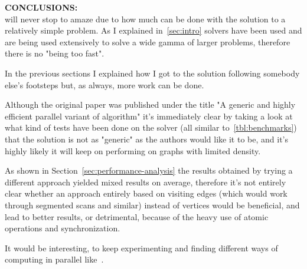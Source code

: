 \documentclass[a4paper,10pt]{article}
\begin{document}
\bigskip
{}
\makeatletter{}\makeatother\label{sec:final-thoughts}
\noindent
\textbf{CONCLUSIONS:}
\\
\mstp will never stop to amaze due to how much can be done with the solution to a relatively simple problem. As I explained in~\ref{sec:intro} \mstp solvers have been used and are being used extensively to solve a wide gamma of larger problems, therefore there is no "being too fast".

In the previous sections I explained how I got to the solution following somebody else's footsteps but, as always, more work can be done.

Although the original paper was published under the title "A generic and highly efficient parallel variant of \brkas algorithm" it's immediately clear by taking a look at what kind of tests have been done on the solver (all similar to~\ref{tbl:benchmarks}) that the solution is not as "generic" as the authors would like it to be, and it's highly likely it will keep on performing on graphs with limited density.

As shown in Section~\ref{sec:performance-analysis} the results obtained by trying a different approach yielded mixed results on average, therefore it's not entirely clear whether an approach entirely based on visiting edges (which would work through segmented scans and similar) instead of vertices would be beneficial, and lead to better results, or detrimental, because of the heavy use of atomic operations and synchronization.

It would be interesting, to keep experimenting and finding different ways of computing \mst in parallel like~\cite{mst-bipartite}.

\clearpage

\printbibliography
\end{document}
